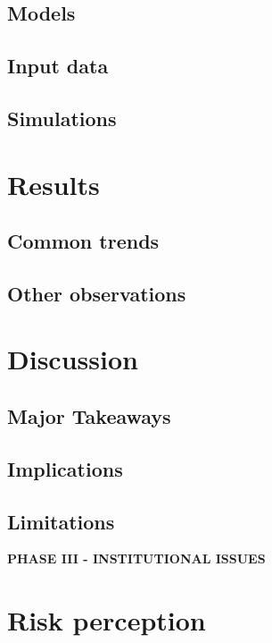 \documentclass[11pt,a4paper]{article}
\begin{document}
\subsection{Models}
\subsection{Input data}
\subsection{Simulations}

\newpage

\section{Results}
\subsection{Common trends}
\subsection{Other observations}

\newpage

\section{Discussion}
\subsection{Major Takeaways}
\subsection{Implications}
\subsection{Limitations}

\newpage

\begin{center}
    \textbf{PHASE III - INSTITUTIONAL ISSUES}
\end{center}

\newpage

\section{Risk perception}

\newpage
\end{document}
